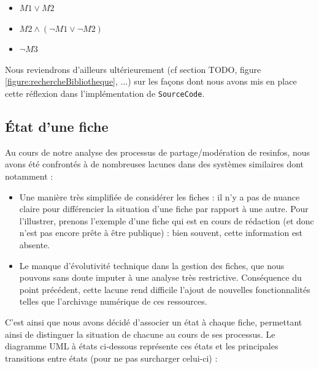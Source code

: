 \begin{itemize}
    \item $M1 \lor M2$
    \item $M2 \land (\neg M1 \lor \neg M2)$
    \item $\neg M3$
\end{itemize}

Nous reviendrons d'ailleurs ultérieurement (cf section TODO, figure \ref{figure:rechercheBibliotheque}, ...) sur les façons dont nous avons mis en place cette réflexion dans l'implémentation de \texttt{SourceCode}.

\pagebreak
\subsection*{État d'une \gls{fiche}}

Au cours de notre analyse des processus de partage/modération de \glspl{resinfo}, nous avons été confrontés à de nombreuses lacunes dans des systèmes similaires dont notamment :
\begin{itemize}
    \item Une manière très simplifiée de considérer les \glspl{fiche} : il n'y a pas de nuance claire pour différencier la situation d'une \gls{fiche} par rapport à une autre. Pour l'illustrer, prenons l'exemple d'une \gls{fiche} qui est en cours de rédaction (et donc n'est pas encore prête à être publique) : bien souvent, cette information est absente.
    \item Le manque d'évolutivité technique dans la gestion des \glspl{fiche}, que nous pouvons sans doute imputer à une analyse très restrictive. Conséquence du point précédent, cette lacune rend difficile l'ajout de nouvelles fonctionnalités telles que l'archivage numérique de ces ressources. 
\end{itemize}

C'est ainsi que nous avons décidé d'associer un état à chaque \gls{fiche}, permettant ainsi de distinguer la situation de chacune au cours de ses processus. Le diagramme UML à états ci-dessous représente ces états et les principales transitions entre états (pour ne pas surcharger celui-ci) :

